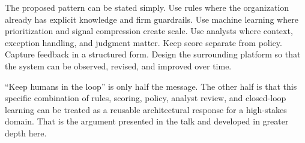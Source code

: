 \documentclass[11pt,a4paper]{article}
\begin{document}
The proposed pattern can be stated simply. Use rules where the organization already has explicit knowledge and firm guardrails. Use machine learning where prioritization and signal compression create scale. Use analysts where context, exception handling, and judgment matter. Keep score separate from policy. Capture feedback in a structured form. Design the surrounding platform so that the system can be observed, revised, and improved over time.

``Keep humans in the loop'' is only half the message. The other half is that this specific combination of rules, scoring, policy, analyst review, and closed-loop learning can be treated as a reusable architectural response for a high-stakes domain. That is the argument presented in the talk and developed in greater depth here.


\end{document}
